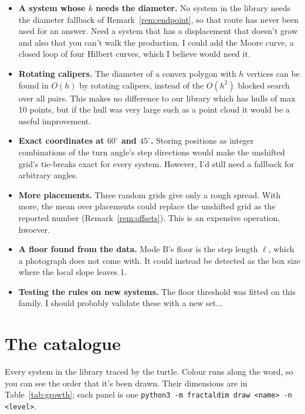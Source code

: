 \documentclass[11pt, a4paper]{article}
\theoremstyle{plain}
\theoremstyle{definition}
\theoremstyle{remark}
\begin{document}
\begin{itemize}
    \item \textbf{A system whose $k$ needs the diameter.} 
    No system in the library needs the diameter fallback of Remark~\ref{rem:endpoint}, so that route has never been used for an answer. 
    Need a system that has a displacement that doesn't grow and also that you can't walk the production.
    I could add the Moore curve, a closed loop of four Hilbert curves, which I believe would need it.

    \item \textbf{Rotating calipers.} 
    The diameter of a convex polygon with $h$ vertices can be found in $O(h)$ by rotating calipers, instead of the $O(h^2)$ blocked search over all pairs. 
    This makes no difference to our library which has hulls of max 10 points, but if the hull was very large such as a point cloud it would be a useful improvement.

    \item \textbf{Exact coordinates at $60^\circ$ and $45^\circ$.} Storing positions as integer combinations of the turn angle's step directions would make the unshifted grid's tie-breaks exact for every system.
    However, I'd still need a fallback for arbitrary angles.

    \item \textbf{More placements.} Three random grids give only a rough spread. 
    With more, the mean over placements could replace the unshifted grid as the reported number (Remark~\ref{rem:offsets}).
    This is an expensive operation, hwoever.

    \item \textbf{A floor found from the data.} Mode B's floor is the step length $\ell$, which a photograph does not come with. 
    It could instead be detected as the box size where the local slope leaves 1.

    \item \textbf{Testing the rules on new systems.} The floor threshold was fitted on this family.
    I should probably validate these with a new set...
\end{itemize}


\newpage
\appendix
\section{The catalogue}
\label{sec:gallery}

Every system in the library traced by the turtle. 
Colour runs along the word, so you can see the order that it's been drawn.
Their dimensions are in Table~\ref{tab:growth}; each panel is one \texttt{python3 -m fractaldim draw <name> -n <level>}.
\end{document}
